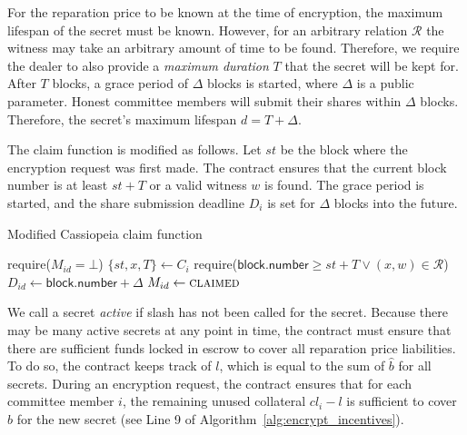 For the reparation price to be known at the time of encryption, the maximum lifespan of the secret must be known.
However, for an arbitrary relation $\mathcal{R}$ the witness may take an arbitrary amount of time to be found.
Therefore, we require the dealer to also provide a \emph{maximum duration} $T$ that the secret will be kept for.
After $T$ blocks, a grace period of $\Delta$ blocks is started, where $\Delta$ is a public parameter.
Honest committee members will submit their shares within $\Delta$ blocks.
Therefore, the secret's maximum lifespan $d = T + \Delta$.

The \textsf{claim} function is modified as follows.
Let $st$ be the block where the encryption request was first made.
The contract ensures that the current block number is at least $st + T$ or a valid witness $w$ is found.
The grace period is started, and the share submission deadline $D_i$ is set for $\Delta$ blocks into the future.

\begin{algorithm}[H]
\caption{Modified Cassiopeia \textsf{claim} function}
    \begin{algorithmic}[1]
                \State require($M_{id} = \bot$)
                \State $\{st, x, T\} \gets C_i$
                \State require($\textsf{block.number} \geq st + T \lor (x, w) \in \mathcal{R}$)
                \State $D_{id} \gets \textsf{block.number} + \Delta$
                \State $M_{id} \gets \textsc{claimed}$
            \EndFunction
    \end{algorithmic}
\end{algorithm}

We call a secret \emph{active} if \textsf{slash} has not been called for the secret.
Because there may be many active secrets at any point in time, the contract must ensure that there are sufficient funds locked in escrow to cover all reparation price liabilities.
To do so, the contract keeps track of $l$, which is equal to the sum of $\hat{b}$ for all secrets.
During an encryption request, the contract ensures that for each committee member $i$, the remaining unused collateral $cl_i - l$ is sufficient to cover $\hat{b}$ for the new secret (see Line 9 of Algorithm~\ref{alg:encrypt_incentives}).

